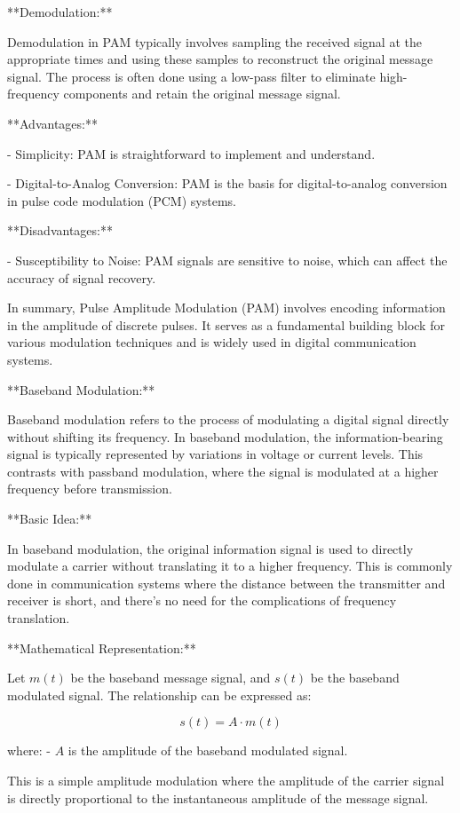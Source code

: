 \documentclass[../../../../DMCC-My-Notebook]{subfiles}
\begin{document}
	**Demodulation:**
	
	Demodulation in PAM typically involves sampling the received signal at the appropriate times and using these samples to reconstruct the original message signal. The process is often done using a low-pass filter to eliminate high-frequency components and retain the original message signal.
	
	**Advantages:**
	
	- Simplicity: PAM is straightforward to implement and understand.
	
	- Digital-to-Analog Conversion: PAM is the basis for digital-to-analog conversion in pulse code modulation (PCM) systems.
	
	**Disadvantages:**
	
	- Susceptibility to Noise: PAM signals are sensitive to noise, which can affect the accuracy of signal recovery.
	
	In summary, Pulse Amplitude Modulation (PAM) involves encoding information in the amplitude of discrete pulses. It serves as a fundamental building block for various modulation techniques and is widely used in digital communication systems.
	
	
	
	**Baseband Modulation:**
	
	Baseband modulation refers to the process of modulating a digital signal directly without shifting its frequency. In baseband modulation, the information-bearing signal is typically represented by variations in voltage or current levels. This contrasts with passband modulation, where the signal is modulated at a higher frequency before transmission.
	
	**Basic Idea:**
	
	In baseband modulation, the original information signal is used to directly modulate a carrier without translating it to a higher frequency. This is commonly done in communication systems where the distance between the transmitter and receiver is short, and there's no need for the complications of frequency translation.
	
	**Mathematical Representation:**
	
	Let \(m(t)\) be the baseband message signal, and \(s(t)\) be the baseband modulated signal. The relationship can be expressed as:
	
	\[ s(t) = A \cdot m(t) \]
	
	where:
	- \( A \) is the amplitude of the baseband modulated signal.
	
	This is a simple amplitude modulation where the amplitude of the carrier signal is directly proportional to the instantaneous amplitude of the message signal.
	
\end{document}
